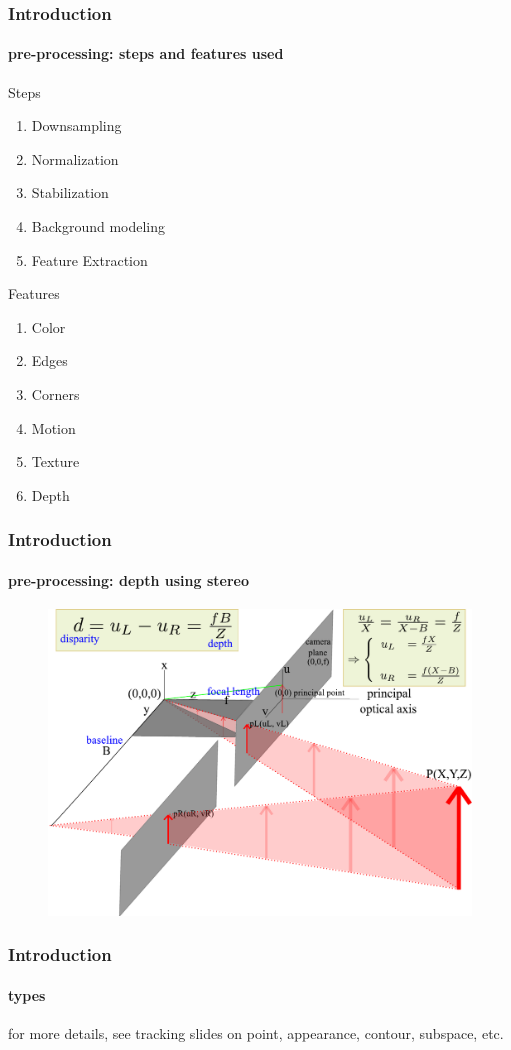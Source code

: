 \begin{frame}
\frametitle{Introduction}
\framesubtitle{pre-processing: steps and features used}
\logoCSIPCPL\mypagenum
	{\color{red}Steps}
	\begin{enumerate}
		\item Downsampling
		\item Normalization
		\item Stabilization
		\item Background modeling
		\item Feature Extraction
	\end{enumerate}
	\vspace{0.1in}
	{\color{red}Features}
	\begin{enumerate}
		\item Color
		\item Edges
		\item Corners
		\item Motion
		\item Texture
		\item Depth
	\end{enumerate}
\end{frame}


\begin{frame}
\frametitle{Introduction}
\framesubtitle{pre-processing: depth using stereo}
\mypagenum
	\begin{figure}		
		\includegraphics[width=1.0\textwidth]{figs/3D_2_cameras_blockDiagram.pdf}
	\end{figure}
\end{frame}	


\begin{frame}
\frametitle{Introduction}
\framesubtitle{types}
\logoCSIPCPL\mypagenum
	for more details, see tracking slides on point, appearance, contour, subspace, etc.
\end{frame}



